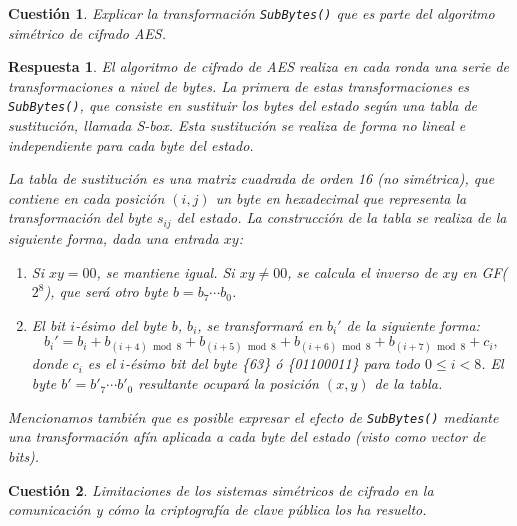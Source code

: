 \documentclass[
  a4paper,
  spanish,
  12pt,
]{scrartcl}
\theoremstyle{ejercicio-style}
\newtheorem{ejer}{Cuestión}
\theoremstyle{remark-style}
\newtheorem*{sol}{Respuesta}
\theoremstyle{teorema-style}
\begin{document}
\begin{ejer}
  Explicar la transformación \texttt{SubBytes()} que es parte del algoritmo simétrico de cifrado AES.
\end{ejer}

\begin{sol}
El algoritmo de cifrado de AES realiza en cada ronda una serie de transformaciones a nivel de bytes. La primera de estas transformaciones es \texttt{SubBytes()}, que consiste en sustituir los bytes del estado según una tabla de sustitución, llamada S-box. Esta sustitución se realiza de forma no lineal e independiente para cada byte del estado.

La tabla de sustitución es una matriz cuadrada de orden 16 (no simétrica), que contiene en cada posición $(i,j)$ un byte en hexadecimal que representa la transformación del byte $s_{ij}$ del estado. La construcción de la tabla se realiza de la siguiente forma, dada una entrada $xy$:

\begin{enumerate}
\item Si $xy = 00$, se mantiene igual. Si $xy \neq 00$, se calcula el inverso de $xy$ en GF($2^8$), que será otro byte $b = b_7\cdots b_0$.
\item El bit $i$-ésimo del byte $b$, $b_i$, se transformará en $b_i'$ de la siguiente forma:
  \[b_i' = b_i + b_{(i+4)\bmod 8} + b_{(i+5)\bmod 8} + b_{(i+6)\bmod 8} + b_{(i+7)\bmod 8} + c_i,
  \]
  donde $c_i$ es el $i$-ésimo bit del byte \{63\} ó \{01100011\} para todo $0 \leq i < 8$. El byte $b' = b'_7\cdots b'_0$ resultante ocupará la posición $(x,y)$ de la tabla.

\end{enumerate}

Mencionamos también que es posible expresar el efecto de \texttt{SubBytes()} mediante una transformación afín aplicada a cada byte del estado (visto como vector de bits).
\end{sol}

\begin{ejer}
  Limitaciones de los sistemas simétricos de cifrado en la comunicación y cómo la criptografía de clave pública los ha resuelto.
\end{ejer}
\end{document}
